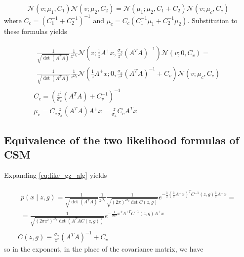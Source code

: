 \documentclass{paper}
\begin{document}
\begin{equation} 
\mathcal{N}(v;\mu_1,C_1) \mathcal{N}(v;\mu_2,C_2) = \mathcal{N}(\mu_1;\mu_2,C_1 + C_2) \mathcal{N}(v; \mu_c,C_c)
\end{equation}
%
where $C_c = (C_1^{-1} + C_2^{-1})^{-1}$ and $\mu_c = C_c (C_1^{-1}\mu_1 + C_2^{-1}\mu_2)$. Substitution to these formulas yields

\begin{eqnarray}
\begin{split}
 \frac{1}{\sqrt{\det(A^TA)}} \frac{1}{z^{D_v}} \mathcal{N}(v;\frac{1}{z}A^{+}x,\frac{\sigma_x}{z^2} (A^TA)^{-1})\mathcal{N}(v;0,C_v) = \\
\frac{1}{\sqrt{\det(A^TA)}} \frac{1}{z^{D_v}} \mathcal{N}(\frac{1}{z}A^{+}x;0,\frac{\sigma_x}{z^2} (A^TA)^{-1} + C_v) \mathcal{N}(v; \mu_c,C_c)
 \end{split} \\
 C_c = (\frac{z^2}{\sigma_x} (A^TA) + C_v^{-1})^{-1} \\
 \mu_c = C_c \frac{z}{\sigma_x} (A^TA) A^{+}x = \frac{z}{\sigma_x} C_c A^{T}x
\end{eqnarray}


\subsection{Equivalence of the two likelihood formulas of CSM} \label{seq:like_equiv}

Expanding \ref{eq:like_gz_alg} yields

\begin{eqnarray}
\begin{split}
p(x \mid z,g) = \frac{1}{\sqrt{\det(A^TA)}} \frac{1}{z^{D_v}} \frac{1}{\sqrt{ (2\pi)^{D_v} \det C(z,g) }} e^{-\frac{1}{2} \left( \frac{1}{z}A^{+}x \right)^T C^{-1}(z,g) \frac{1}{z}A^{+}x}  = \\
= \frac{1}{\sqrt{ (2\pi z^2)^{D_v} \det(A^TA C(z,g))}} e^{-\frac{1}{2z^2} x^TA^{+T} C^{-1}(z,g) A^{+}x}
\end{split} \\
C(z,g) \equiv \frac{\sigma_x}{z^2} (A^TA)^{-1} + C_v
\end{eqnarray}
%
so in the exponent, in the place of the covariance matrix, we have
\end{document}
